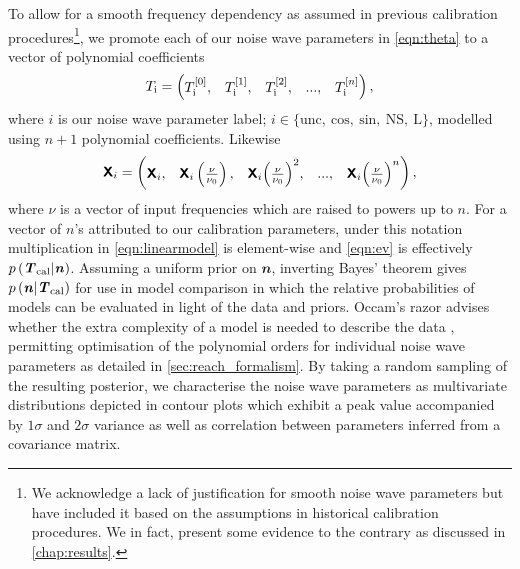 To allow for a smooth frequency dependency as assumed in previous calibration procedures\footnote{We acknowledge a lack of justification for smooth noise wave parameters but have included it based on the assumptions in historical calibration procedures. We in fact, present some evidence to the contrary as discussed in \cref{chap:results}.}, we promote each of our noise wave parameters in \cref{eqn:theta} to a vector of polynomial coefficients
\begin{equation}
    T_{\mathrm{i}} = \begin{pmatrix}
    T_{\mathrm{i}}^{[0]}, & T_{\mathrm{i}}^{[1]}, & T_{\mathrm{i}}^{[2]}, & ..., & T_{\mathrm{i}}^{[n]}
    \end{pmatrix},
    \label{eqn:nwp_matrix}
\end{equation}
where $i$ is our noise wave parameter label; $i \in \{\mathrm{unc, \ cos, \ sin , \ NS, \ L}\}$, modelled using $n+1$ polynomial coefficients. Likewise
\begin{equation}
    \textbf{\textsf{X}}_{i} = \begin{pmatrix}
    \textbf{\textsf{X}}_{i}, & \textbf{\textsf{X}}_{i}\left(\frac{\nu}{\nu_0}\right), & \textbf{\textsf{X}}_{i}{\left(\frac{\nu}{\nu_0}\right)}^2, & ..., &  \textbf{\textsf{X}}_{i}{\left(\frac{\nu}{\nu_0}\right)}^{n}
    \end{pmatrix},
    \label{eqn:data_matrix}
\end{equation}
where $\nu$ is a vector of input frequencies which are raised to powers up to $n$. For a vector of $n$'s attributed to our calibration parameters, under this notation multiplication in \cref{eqn:linearmodel} is element-wise and \cref{eqn:ev} is effectively $p\left(\textbf{\textit{T}}_{\mathrm{cal}}|\textbf{\textit{n}}\right)$. Assuming a uniform prior on $\mathbfit{n}$, inverting Bayes' theorem gives $p\left(\textbf{\textit{n}}|\textbf{\textit{T}}_{\mathrm{cal}}\right)$ for use in model comparison in which the relative probabilities of models can be evaluated in light of the data and priors. Occam’s razor advises whether the extra complexity of a model is needed to describe the data \citep{trotta}, permitting optimisation of the polynomial orders for individual noise wave parameters as detailed in \cref{sec:reach_formalism}. By taking a random sampling of the resulting posterior, we characterise the noise wave parameters as multivariate distributions depicted in contour plots which exhibit a peak value accompanied by $1\sigma$ and $2\sigma$ variance as well as correlation between parameters inferred from a covariance matrix.


